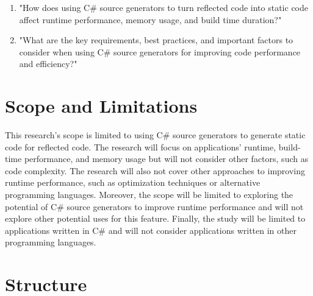 \begin{enumerate}[label=\textbf{RQ.\arabic*}:, leftmargin=*, labelindent=1em]
    \item "How does using C\# source generators to turn reflected code into static code affect runtime performance, memory usage, and build time duration?"
    \item "What are the key requirements, best practices, and important factors to consider when using C\# source generators for improving code performance and efficiency?"
\end{enumerate}

\section{Scope and Limitations}

This research's scope is limited to using C\# source generators to generate static code for reflected code. The research will focus on applications' runtime, build-time performance, and memory usage but will not consider other factors, such as code complexity. The research will also not cover other approaches to improving runtime performance, such as optimization techniques or alternative programming languages. Moreover, the scope will be limited to exploring the potential of C\# source generators to improve runtime performance and will not explore other potential uses for this feature. Finally, the study will be limited to applications written in C\# and will not consider applications written in other programming languages.

\section{Structure}